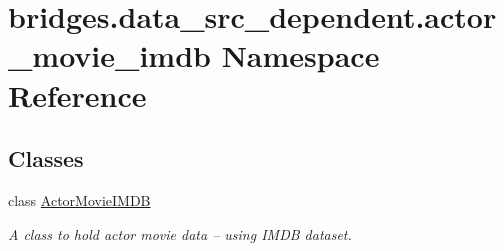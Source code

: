 \hypertarget{namespacebridges_1_1data__src__dependent_1_1actor__movie__imdb}{}\section{bridges.\+data\+\_\+src\+\_\+dependent.\+actor\+\_\+movie\+\_\+imdb Namespace Reference}
\label{namespacebridges_1_1data__src__dependent_1_1actor__movie__imdb}
\subsection*{Classes}
\begin{DoxyCompactItemize}
\item 
class \hyperlink{classbridges_1_1data__src__dependent_1_1actor__movie__imdb_1_1_actor_movie_i_m_d_b}{Actor\+Movie\+I\+M\+DB}
\begin{DoxyCompactList}\small\item\em A class to hold actor movie data -- using I\+M\+DB dataset. \end{DoxyCompactList}\end{DoxyCompactItemize}
